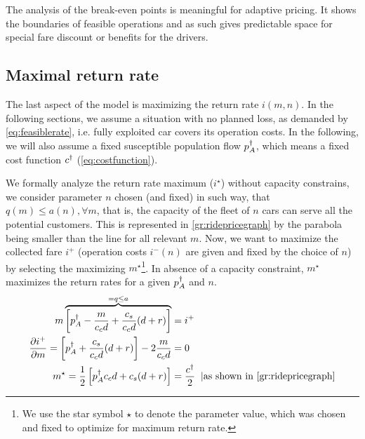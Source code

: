\documentclass[a4paper]{report}
\begin{document}
The analysis of the break-even points is meaningful for adaptive pricing. It shows the boundaries of feasible operations and as such gives predictable space for special fare discount or benefits for the drivers.

\newpage
\def\ms{m^{\star}}
\def\ns{n^\star}
\def\ccd{\frac{c_Mc_cd}{\tau}}
\subsection{Maximal return rate}
The last aspect of the model is maximizing the return rate $i(m,n)$. In the following sections, we assume a situation with no planned loss, as demanded by \autoref{eq:feasiblerate}, i.e. fully exploited car covers its operation costs. In the following, we will also assume a fixed susceptible population flow $p_A^{\dagger}$, which means a fixed cost function $c^{\dagger}$ (\autoref{eq:costfunction}). %

We formally analyze the return rate maximum ($i^\star$) without capacity constrains, we consider parameter $n$ chosen (and fixed) in such way, that $q(m)\leq a(n), \forall m$, that is, the capacity of the fleet of $n$ cars can serve all the potential customers. This is represented in \autoref{gr:ridepricegraph} by the parabola being smaller than the line for all relevant $m$. Now, we want to maximize the collected fare $i^+$ (operation costs $i^-(n)$ are given and fixed by the choice of $n$) by selecting the maximizing $\ms$\footnote{We use the star symbol $\star$ to denote the parameter value, which was chosen and fixed to optimize for maximum return rate.}.
In absence of a capacity constraint, $\ms$ maximizes the return rates for a given $p_A^{\dagger}$ and $n$.
\begin{align}
	m\overbrace{\left[\pd - \frac{m}{c_cd}+\frac{c_s}{c_cd}(d+r)\right]}^{=q\leq a}&=i^{+}\nonumber\\
	\frac{\partial i^{+}}{\partial m}=\left[\pd+\frac{c_s}{c_cd}(d+r)\right] - 2\frac{m}{c_cd}&=0\nonumber\\
	\ms=\frac{1}{2}\left[\pd c_cd+c_s(d+r)\right]&=\frac{\cd}{2}\;\;|\text{as shown in \autoref{gr:ridepricegraph}}\label{eq:maxreturngeneral}
\end{align}
\end{document}
